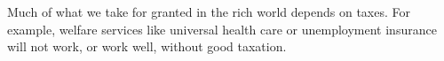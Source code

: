 Much of what we take for granted in the rich world depends on taxes. For example, welfare services like universal health care or unemployment insurance will not work, or work well, without good taxation.

